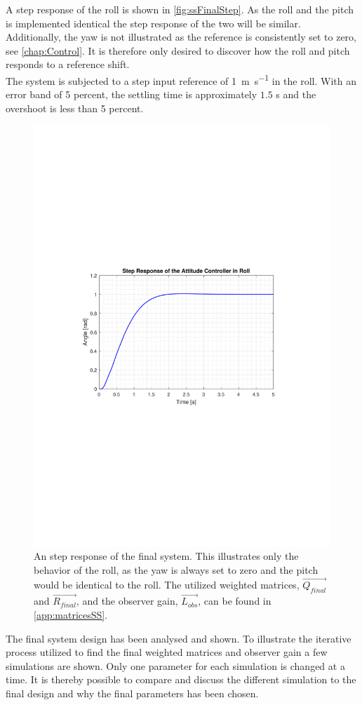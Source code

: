 %
A step response of the roll is shown in \autoref{fig:ssFinalStep}. As the roll and the pitch is implemented identical the step response of the two will be similar. Additionally, the yaw is not illustrated as the reference is consistently set to zero, see \autoref{chap:Control}. It is therefore only desired to discover how the roll and pitch responds to a reference shift. \\ The system is subjected to a step input reference of \SI{1}{m s^{-1}} in the roll. With an error band of 5 percent, the settling time is approximately $1.5$ \si{s} and the overshoot is less than 5 percent. 
%
\begin{figure}[H]
	\centering
	\includegraphics[scale=0.8]{figures/ssFinalStep.pdf}
	\caption{An step response of the final system. This illustrates only the behavior of the roll, as the yaw is always set to zero and the pitch would be identical to the roll. The utilized weighted matrices, $\vec{Q_{final}}$ and $\vec{R_{final}}$, and the observer gain, $\vec{L_{obs}}$, can be found in \autoref{app:matricesSS}.}
	\label{fig:ssFinalStep}
\end{figure}
%
The final system design has been analysed and shown. To illustrate the iterative process utilized to find the final weighted matrices and observer gain a few simulations are shown. Only one parameter for each simulation is changed at a time. It is thereby possible to compare and discuss the different simulation to the final design and why the final parameters has been chosen.

